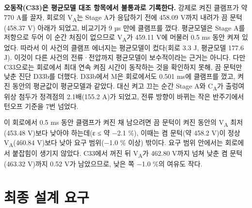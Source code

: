\textbf{오동작(C33)은 평균모델 대조 항목에서 불통과로 기록한다.} 강제로 켜진 클램프가 약 770 A를 끌자, 회로의 V\textsubscript{A}는 Stage A가 응답하기 전에 458.09 V까지 내려가 끔 문턱(458.37 V) 아래가 되었고, 비교기가 9 µs 만에 클램프를 껐다. 평균모델은 Stage A를 저항으로 두어 이 순간 처짐이 없으므로 V\textsubscript{A}가 459.11 V에 머물러 0.5 ms 동안 켜져 있었다. 따라서 이 사건의 클램프 에너지는 평균모델이 컸다(회로 3.3 J, 평균모델 177.6 J). 이것이 다른 사건의 전류·전압까지 평균모델이 보수적이라는 근거는 아니다. 다만 C33으로는 회로에서 최대 연속 켜짐 시간이 동작하는 것을 확인하지 못해, 끔 문턱만 낮춘 진단 D33b를 더했다. D33b에서 M은 회로에서도 0.501 ms에 클램프를 껐고, 켜진 동안의 평균값이 평균모델과 같았다. 대신 켜고 끄는 순간 Stage A와 C\textsubscript{A}가 출렁여 위상 첨두가 정격점의 2.1배(155.2 A)가 되었고, 전류 방향이 바뀌는 작은 반주기에서 턴오프 기준을 7번 넘었다.

이 회로에서 0.5 ms 동안 클램프가 켜진 채 남으려면 끔 문턱이 켜진 동안의 V\textsubscript{A} 최저(453.48 V)보다 낮아야 하는데(ε ≤ 약 −2.1 \%), 이때는 켬 문턱(약 458.2 V)이 정상 V\textsubscript{A}(460.84 V)보다 낮아 요구 범위(−1.0 \% 이상) 밖이다. 요구 범위 안에서는 회로에서 붙잡힘이 생기지 않았다. C33에서 꺼진 뒤 V\textsubscript{A}가 462.80 V까지 넘쳐 낮춘 켬 문턱(463.32 V)까지 0.52 V가 남았으므로, 낮은 쪽 −1.0 \%의 여유도 작다.

\section{최종 설계 요구}

